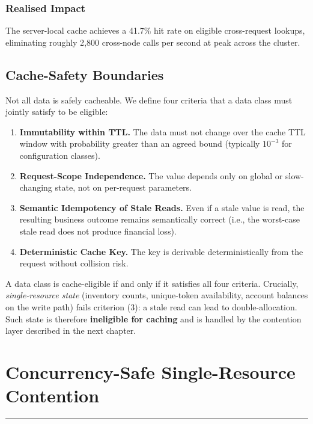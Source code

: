 \documentclass[12pt,a4paper,oneside]{report}
\begin{document}
\subsection{Realised Impact}
The server-local cache achieves a 41.7\% hit rate on eligible cross-request lookups, eliminating roughly 2{,}800 cross-node calls per second at peak across the cluster.

\section{Cache-Safety Boundaries}
\label{sec:safety}
Not all data is safely cacheable. We define four criteria that a data class must jointly satisfy to be eligible:

\begin{enumerate}[leftmargin=*]
    \item \textbf{Immutability within TTL.} The data must not change over the cache TTL window with probability greater than an agreed bound (typically $10^{-3}$ for configuration classes).
    \item \textbf{Request-Scope Independence.} The value depends only on global or slow-changing state, not on per-request parameters.
    \item \textbf{Semantic Idempotency of Stale Reads.} Even if a stale value is read, the resulting business outcome remains semantically correct (i.e., the worst-case stale read does not produce financial loss).
    \item \textbf{Deterministic Cache Key.} The key is derivable deterministically from the request without collision risk.
\end{enumerate}

A data class is cache-eligible if and only if it satisfies all four criteria. Crucially, \emph{single-resource state} (inventory counts, unique-token availability, account balances on the write path) fails criterion (3): a stale read can lead to double-allocation. Such state is therefore \textbf{ineligible for caching} and is handled by the contention layer described in the next chapter.


\chapter[Concurrency-Safe Contention]{Concurrency-Safe Single-Resource Contention}
\label{ch:contention}
\vspace{-1cm}
\noindent \rule{6.6in}{0.01in}
\end{document}
